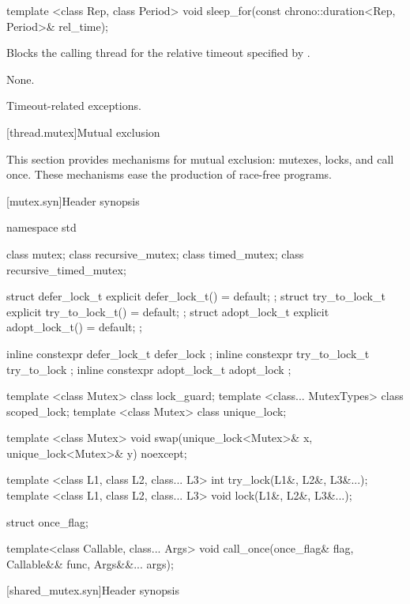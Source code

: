 %
\begin{itemdecl}
template <class Rep, class Period>
  void sleep_for(const chrono::duration<Rep, Period>& rel_time);
\end{itemdecl}

\begin{itemdescr}
\pnum
\effects Blocks the calling thread for the relative timeout specified
by .

\pnum
\sync None.

\pnum
\throws Timeout-related exceptions.
\end{itemdescr}

[thread.mutex]{Mutual exclusion}

\pnum
This section provides mechanisms for mutual exclusion: mutexes, locks, and call
once. These mechanisms ease the production of race-free
programs.

[mutex.syn]{Header  synopsis}
%
%

\begin{codeblock}
namespace std {
  class mutex;
  class recursive_mutex;
  class timed_mutex;
  class recursive_timed_mutex;

  struct defer_lock_t { explicit defer_lock_t() = default; };
  struct try_to_lock_t { explicit try_to_lock_t() = default; };
  struct adopt_lock_t { explicit adopt_lock_t() = default; };

  inline constexpr defer_lock_t  defer_lock { };
  inline constexpr try_to_lock_t try_to_lock { };
  inline constexpr adopt_lock_t  adopt_lock { };

  template <class Mutex> class lock_guard;
  template <class... MutexTypes> class scoped_lock;
  template <class Mutex> class unique_lock;

  template <class Mutex>
    void swap(unique_lock<Mutex>& x, unique_lock<Mutex>& y) noexcept;

  template <class L1, class L2, class... L3> int try_lock(L1&, L2&, L3&...);
  template <class L1, class L2, class... L3> void lock(L1&, L2&, L3&...);

  struct once_flag;

  template<class Callable, class... Args>
    void call_once(once_flag& flag, Callable&& func, Args&&... args);
}
\end{codeblock}

[shared_mutex.syn]{Header  synopsis}
%
%

